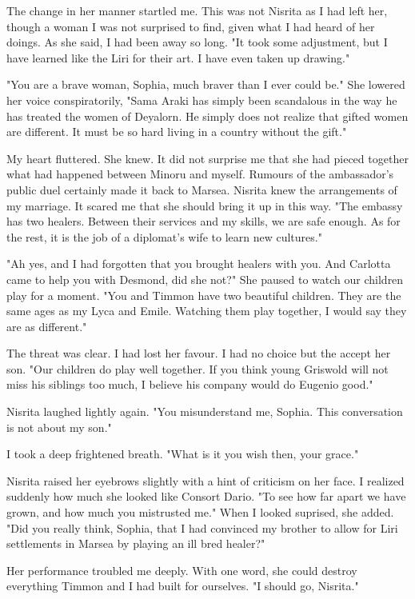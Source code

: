 \documentclass{article}
\begin{document}
The change in her manner startled me. This was not Nisrita as I had left her, though a woman I was not surprised to find, given what I had heard of her doings. As she said, I had been away so long. "It took some adjustment, but I have learned like the Liri for their art. I have even taken up drawing."

"You are a brave woman, Sophia, much braver than I ever could be." She lowered her voice conspiratorily, "Sama Araki has simply been scandalous in the way he has treated the women of Deyalorn. He simply does not realize that gifted women are different. It must be so hard living in a country without the gift."

My heart fluttered. She knew. It did not surprise me that she had pieced together what had happened between Minoru and myself. Rumours of the ambassador's public duel certainly made it back to Marsea. Nisrita knew the arrangements of my marriage. It scared me that she should bring it up in this way. "The embassy has two healers. Between their services and my skills, we are safe enough. As for the rest, it is the job of a diplomat's wife to learn new cultures."

"Ah yes, and I had forgotten that you brought healers with you. And Carlotta came to help you with Desmond, did she not?" She paused to watch our children play for a moment. "You and Timmon have two beautiful children. They are the same ages as my Lyca and Emile. Watching them play together, I would say they are as different."

The threat was clear. I had lost her favour. I had no choice but the accept her son. "Our children do play well together. If you think young Griswold will not miss his siblings too much, I believe his company would do Eugenio good."

Nisrita laughed lightly again. "You misunderstand me, Sophia. This conversation is not about my son."

I took a deep frightened breath. "What is it you wish then, your grace."

Nisrita raised her eyebrows slightly with a hint of criticism on her face. I realized suddenly how much she looked like Consort Dario. "To see how far apart we have grown, and how much you mistrusted me." When I looked suprised, she added. "Did you really think, Sophia, that I had convinced my brother to allow for Liri settlements in Marsea by playing an ill bred healer?"

Her performance troubled me deeply. With one word, she could destroy everything Timmon and I had built for ourselves. "I should go, Nisrita."
\end{document}
